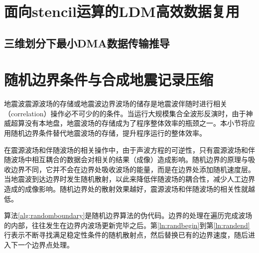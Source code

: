 
\section{面向stencil运算的LDM高效数据复用} %
\label{sec:面向stencil运算的ldm高效数据复用}



\subsection{三维划分下最小DMA数据传输推导} %
\label{sub:三维划分下最小DMA数据传输推导}








\section{随机边界条件与合成地震记录压缩} %
\label{sec:随机边界条件与合成地震记录压缩}

地震波震源波场的存储或地震波边界波场的储存是地震波伴随时进行相关（correlation）操作必不可少的的条件。当运行大规模集合全波形反演时，由于神威超算没有本地盘，地震波场的存储成为了程序整体效率的瓶颈之一。本小节将应用随机边界条件替代地震波场的存储，提升程序运行的整体效率。

在震源波场和伴随波场的相关操作中，由于声波方程的可逆性，只有震源波场和伴随波场中相互耦合的数据会对相关的结果（成像）造成影响。随机边界的原理与吸收边界不同，它并不会在边界处吸收波场的能量，而是在边界处添加随机速度层。当地震波到达边界时发生随机散射，以此来降低伴随波场的耦合性，减少人工边界造成的成像影响。随机边界处的散射效果越好，震源波场和伴随波场的相关性就越低。

算法\ref{alg:randomboundary}是随机边界算法的伪代码。边界的处理在遍历完成波场的内部，往往发生在边界内波场更新完毕之后。第\ref{ln:randbegin}到第\ref{ln:randend}行表示不断寻找满足稳定性条件的随机散射点，然后替换已有的边界速度，随后进入下一个边界点处理。

